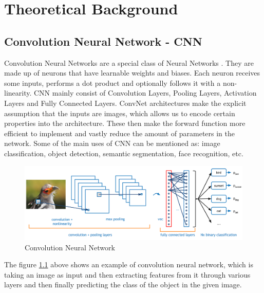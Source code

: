 \chapter{Theoretical Background}

\section{ Convolution Neural Network - CNN }
Convolution Neural Networks are a special class of Neural Networks \cite{masood2018real}. They are made up 
of neurons that have learnable weights and biases. Each neuron receives some inputs, 
performs a dot product and optionally follows it with a non-linearity. CNN mainly consist
of Convolution Layers, Pooling Layers, Activation Layers and Fully Connected Layers.
ConvNet architectures make the explicit assumption that the inputs are images, 
which allows us to encode certain properties into the architecture. These then 
make the forward function more efficient to implement and vastly reduce the amount 
of parameters in the network. Some of the main uses of CNN can be mentioned as: image
classification, object detection, semantic segmentation, face recognition, etc.
    
\begin{figure}[H]
	\centering
	\includegraphics[width=\textwidth]{img/Chap3/Cover.png}
	\caption{Convolution Neural Network}
	\label{fig:Chap3-OverviewTheCNN}
\end{figure}
The figure \ref{fig:Chap3-OverviewTheCNN} above shows an example of convolution neural network, which is taking an image 
as input and then extracting features from it through various layers and then finally predicting the
class of the object in the given image.

